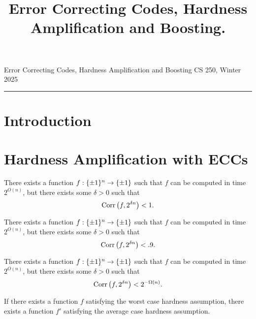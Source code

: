\documentclass[11pt]{article}
\title{Error Correcting Codes, Hardness Amplification and Boosting.}
\date{}
\begin{document}
    
\noindent Error Correcting Codes, Hardness Amplification and Boosting \hfill  CS 250, Winter 2025\\
\hrule


\section{Introduction}


\section{Hardness Amplification with ECCs}

\begin{assumption}{1} \label{a-1}
    There exists a function $f : \{\pm 1\}^n \rightarrow \{\pm 1\}$ such that $f$ can be computed in time $2^{O(n)}$, but there exists some $\delta > 0$ such that 
    \begin{equation*}
        \mathrm{Corr}\left(f, 2^{\delta n}\right) < 1.
    \end{equation*}
\end{assumption}

\begin{assumption}{2} \label{a-2}
    There exists a function $f : \{\pm 1\}^n \rightarrow \{\pm 1\}$ such that $f$ can be computed in time $2^{O(n)}$, but there exists some $\delta > 0$ such that 
    \begin{equation*}
        \mathrm{Corr}\left(f, 2^{\delta n}\right) < .9.
    \end{equation*}
\end{assumption}

\begin{assumption}{3} \label{a-3}
    There exists a function $f : \{\pm 1\}^n \rightarrow \{\pm 1\}$ such that $f$ can be computed in time $2^{O(n)}$, but there exists some $\delta > 0$ such that 
    \begin{equation*}
        \mathrm{Corr}\left(f, 2^{\delta n}\right) < 2^{-\Omega(n)}.
    \end{equation*}
\end{assumption}




\begin{theorem}{2.1}[\cite{iw97}, \cite{STV99}]\label{t-2-1}
    If there exists a function $f$ satisfying the worst case hardness assumption, there exists a function $f'$ satisfying the average case hardness assumption.
\end{theorem}
\end{document}
